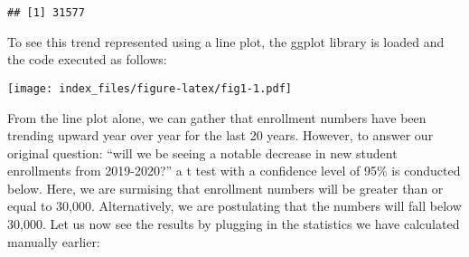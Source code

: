 \documentclass[
]{article}
\newenvironment{Shaded}{\begin{snugshade}}{\end{snugshade}}
\newcommand{\CharTok}[1]{\textcolor[rgb]{0.31,0.60,0.02}{#1}}
\newcommand{\DataTypeTok}[1]{\textcolor[rgb]{0.13,0.29,0.53}{#1}}
\newcommand{\DecValTok}[1]{\textcolor[rgb]{0.00,0.00,0.81}{#1}}
\newcommand{\FloatTok}[1]{\textcolor[rgb]{0.00,0.00,0.81}{#1}}
\newcommand{\KeywordTok}[1]{\textcolor[rgb]{0.13,0.29,0.53}{\textbf{#1}}}
\newcommand{\NormalTok}[1]{#1}
\newcommand{\OperatorTok}[1]{\textcolor[rgb]{0.81,0.36,0.00}{\textbf{#1}}}
\newcommand{\StringTok}[1]{\textcolor[rgb]{0.31,0.60,0.02}{#1}}
\begin{document}
\begin{verbatim}
## [1] 31577
\end{verbatim}

To see this trend represented using a line plot, the ggplot library is
loaded and the code executed as follows:

\begin{Shaded}
\end{Shaded}

\texttt{[image: index\_files/figure-latex/fig1-1.pdf]}

From the line plot alone, we can gather that enrollment numbers have
been trending upward year over year for the last 20 years. However, to
answer our original question: ``will we be seeing a notable decrease in
new student enrollments from 2019-2020?'' a t test with a confidence
level of 95\% is conducted below. Here, we are surmising that enrollment
numbers will be greater than or equal to 30,000. Alternatively, we are
postulating that the numbers will fall below 30,000. Let us now see the
results by plugging in the statistics we have calculated manually
earlier:
\end{document}
